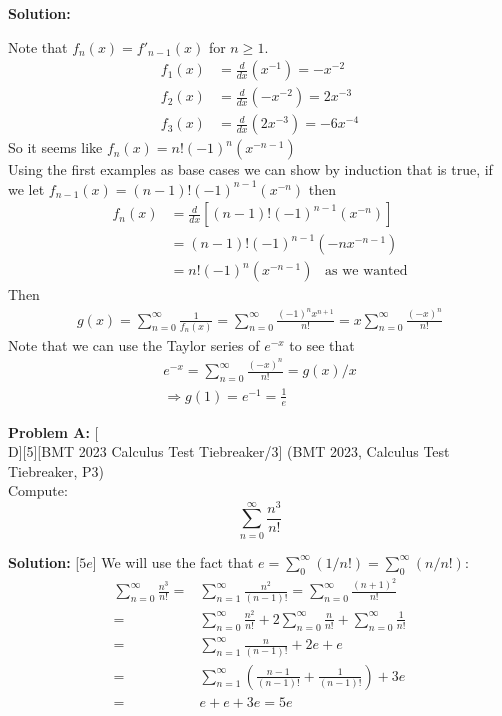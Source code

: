 \documentclass[12pt]{article}
\newcounter{problem}
\newenvironment{problem}[1]{%
    \stepcounter{problem}
    \noindent\textbf{Problem A\theproblem:} #1
    \\[1em]
}{}
\newenvironment{solution}{%
    \vspace{1em}
    \noindent\textbf{Solution:} 
}{}
\begin{document}
\begin{solution}
      Note that \( f_n(x) = f'_{n-1}(x) \) for \( n \geq 1 \).
      \begin{align*}
         f_1(x) &= \frac{d}{dx} (x^{-1}) = -x^{-2} \\
         f_2(x) &= \frac{d}{dx} (-x^{-2}) = 2x^{-3} \\
         f_3(x) &= \frac{d}{dx} (2x^{-3}) = -6x^{-4}
      \end{align*}
      So it seems like \( f_n(x) = n!(-1)^n(x^{-n-1}) \) \\
      Using the first examples as base cases we can show by induction that is true, if we let \( f_{n-1}(x) = (n-1)!(-1)^{n-1}(x^{-n}) \) then
      \begin{align*}
         f_n(x) &= \frac{d}{dx} \left[ (n-1)!(-1)^{n-1}(x^{-n}) \right] \\
         &= (n-1)!(-1)^{n-1}(-nx^{-n-1}) \\
         &= n!(-1)^n(x^{-n-1}) \hspace{10pt} \text{as we wanted}
      \end{align*}
      Then 
      \begin{align*}
         g(x) = \sum_{n=0}^{\infty} \frac{1}{f_n(x)} = \sum_{n=0}^{\infty} 
         \frac{ (-1)^nx^{n+1}} {n!} =  x\sum_{n=0}^{\infty} 
         \frac{ (-x)^n }{n!}
      \end{align*}
      Note that we can use the Taylor series of \(e^{-x}\) to see that
      \begin{align*}
         e^{-x} = \sum_{n=0}^{\infty} \frac{ (-x)^n }{n!} = g(x)/x \\
         \Rightarrow g(1) = e^{-1} = \frac{1}{e}
      \end{align*}
\end{solution}

\vskip 1cm

\begin{problem}[D][5][BMT 2023 Calculus Test Tiebreaker/3]
    (BMT 2023, Calculus Test Tiebreaker, P3) \\ Compute:
    \[ \sum_{n=0}^{\infty} \frac{n^3}{n!} \]
\end{problem}

\begin{solution}[$5e$]
   We will use the fact that $e = \sum_0^\infty (1/n!) = \sum_0^\infty (n/n!)$:
    \begin{align*}
        \sum_{n=0}^{\infty} \frac{n^3}{n!} =& \sum_{n=1}^{\infty} \frac{n^2}{(n-1)!}
        = \sum_{n=0}^{\infty} \frac{(n+1)^2}{n!} \\
        =& \sum_{n=0}^{\infty} \frac{n^2}{n!} + 2\sum_{n=0}^{\infty} \frac{n}{n!} +
        \sum_{n=0}^{\infty} \frac{1}{n!} \\
        =& \sum_{n=1}^{\infty} \frac{n}{(n-1)!} +  2e + e \\
        =& \sum_{n=1}^{\infty} \left( \frac{n-1}{(n-1)!} + \frac{1}{(n-1)!} \right) + 3e \\
        =& e+e+3e = \boxed{5e}
    \end{align*}
\end{solution}
\end{document}
